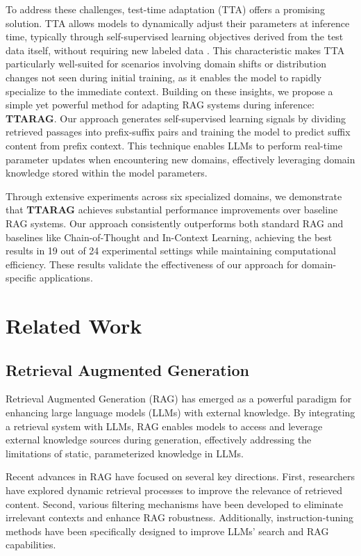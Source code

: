 \documentclass{article}
\newcommand{\ourmethod}{{\fontfamily{lmtt}\selectfont \textbf{TTARAG}}\xspace}
\begin{document}
To address these challenges, test-time adaptation (TTA) \cite{sun2020test, karmanov2024efficienttesttimeadaptationvisionlanguage} offers a promising solution. TTA allows models to dynamically adjust their parameters at inference time, typically through self-supervised learning objectives derived from the test data itself, without requiring new labeled data \cite{liang2024comprehensive}. This characteristic makes TTA particularly well-suited for scenarios involving domain shifts or distribution changes not seen during initial training, as it enables the model to rapidly specialize to the immediate context. Building on these insights, we propose a simple yet powerful method for adapting RAG systems during inference: \ourmethod. Our approach generates self-supervised learning signals by dividing retrieved passages into prefix-suffix pairs and training the model to predict suffix content from prefix context. This technique enables LLMs to perform real-time parameter updates when encountering new domains, effectively leveraging domain knowledge stored within the model parameters.


Through extensive experiments across six specialized domains, we demonstrate that \ourmethod achieves substantial performance improvements over baseline RAG systems. Our approach consistently outperforms both standard RAG and  baselines like Chain-of-Thought and In-Context Learning, achieving the best results in 19 out of 24 experimental settings while maintaining computational efficiency. These results validate the effectiveness of our approach for domain-specific applications.

\section{Related Work}

\subsection{Retrieval Augmented Generation}
Retrieval Augmented Generation (RAG) \cite{lewis2020retrieval} has emerged as a powerful paradigm for enhancing large language models (LLMs) with external knowledge. By integrating a retrieval system with LLMs, RAG enables models to access and leverage external knowledge sources during generation, effectively addressing the limitations of static, parameterized knowledge in LLMs.

Recent advances in RAG have focused on several key directions. First, researchers have explored dynamic retrieval processes \cite{jiang-etal-2023-active,jeong-etal-2024-adaptive} to improve the relevance of retrieved content. Second, various filtering mechanisms \cite{robustlm,yu2024rankrag} have been developed to eliminate irrelevant contexts and enhance RAG robustness. Additionally, instruction-tuning methods \cite{liu2024chatqa,lin2024radit} have been specifically designed to improve LLMs' search and RAG capabilities.
\end{document}
